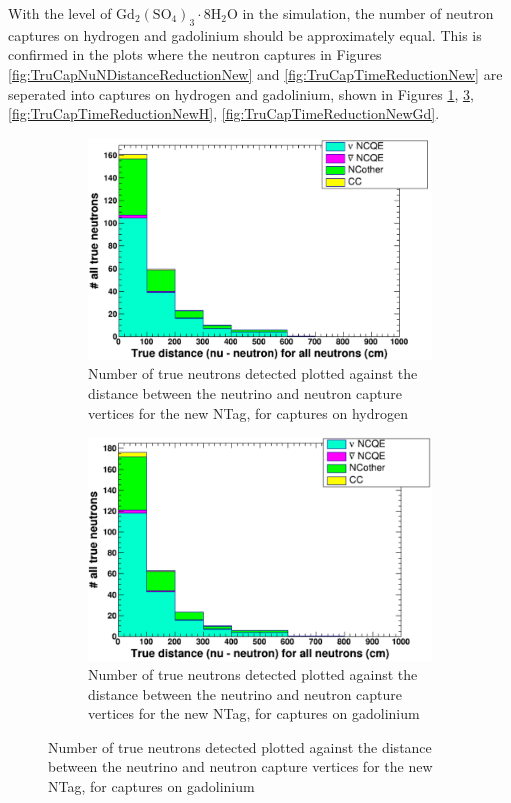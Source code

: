 With the level of $\mathrm{Gd}_{2}\left(\mathrm{SO}_{4}\right)_{3} \cdot 8 \mathrm{H}_{2} \mathrm{O}$ in the simulation, the number of neutron captures on hydrogen and gadolinium should be approximately equal. This is confirmed in the plots where the neutron captures in Figures \ref{fig:TruCapNuNDistanceReductionNew} and \ref{fig:TruCapTimeReductionNew} are seperated into captures on hydrogen and gadolinium, shown in Figures \ref{fig:TruCapNuNDistanceReductionNewH}, \ref{fig:TruCapNuNDistanceReductionNewGd}, \ref{fig:TruCapTimeReductionNewH}, \ref{fig:TruCapTimeReductionNewGd}.

\begin{figure}
    \centering
     \begin{subfigure}[b]{0.49\linewidth}
      \includegraphics[width=\linewidth]{Figures/TruCapNuNDistanceReductionNewH.PNG}
      \caption{Number of true neutrons detected plotted against the distance between the neutrino and neutron capture vertices for the new NTag, for captures on hydrogen}
      \label{fig:TruCapNuNDistanceReductionNewH} 
     \end{subfigure}
     \begin{subfigure}[b]{0.49\linewidth}
       \includegraphics[width=\linewidth]{Figures/TruCapNuNDistanceReductionNewGd.PNG}
        \caption{Number of true neutrons detected plotted against the distance between the neutrino and neutron capture vertices for the new NTag, for captures on gadolinium} 
        \label{fig:TruCapNuNDistanceReductionNewGd}
      \end{subfigure} 
\end{figure}


